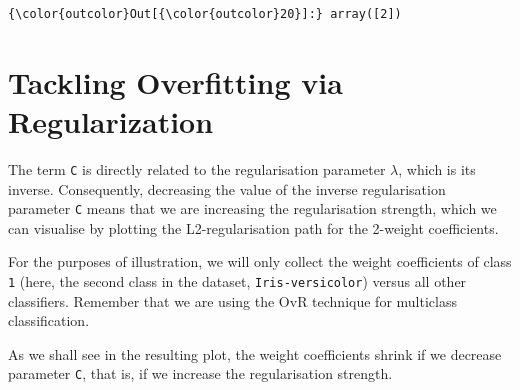 \documentclass[11pt]{article}
\begin{document}
\begin{Verbatim}[commandchars=\\\{\}]
{\color{outcolor}Out[{\color{outcolor}20}]:} array([2])
\end{Verbatim}
            
    \section{Tackling Overfitting via
Regularization}\label{tackling-overfitting-via-regularization}

The term \texttt{C} is directly related to the regularisation parameter
\(\lambda\), which is its inverse. Consequently, decreasing the value of
the inverse regularisation parameter \texttt{C} means that we are
increasing the regularisation strength, which we can visualise by
plotting the L2-regularisation path for the 2-weight coefficients.

For the purposes of illustration, we will only collect the weight
coefficients of class \texttt{1} (here, the second class in the dataset,
\texttt{Iris-versicolor}) versus all other classifiers. Remember that we
are using the OvR technique for multiclass classification.

As we shall see in the resulting plot, the weight coefficients shrink if
we decrease parameter \texttt{C}, that is, if we increase the
regularisation strength.
\end{document}
